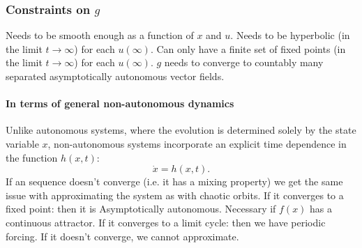 \documentclass{article}
\theoremstyle{definition} \newtheorem{definition}{Definition}
\theoremstyle{remark} \newtheorem{remark}{Remark}
\newcounter{ct}
\begin{document}
%






\subsubsection{Constraints on $g$}
Needs to be smooth enough as a function of $x$ and $u$.
%
Needs to be hyperbolic (in the limit $t\rightarrow\infty$) for each $u(\infty)$.
%
Can only have a finite set of fixed points (in the limit $t\rightarrow\infty$) for each $u(\infty)$.
$g$ needs to converge to countably many separated asymptotically autonomous vector fields.

\paragraph{In terms of general non-autonomous dynamics}
Unlike autonomous systems, where the evolution is determined solely by the state variable $x$, non-autonomous systems incorporate an explicit time dependence in the function $h(x,t)$:
\begin{equation}
\dot x = h(x,t).
\end{equation}
If an sequence doesn't converge (i.e. it has a mixing property) we get the same issue with approximating the system as with chaotic orbits.
If it converges to a fixed point: then it is Asymptotically autonomous. Necessary if $f(x)$ has a continuous attractor.
If it converges to a limit cycle: then we have periodic forcing. 
If it doesn't converge, we cannot approximate.  %
\end{document}
